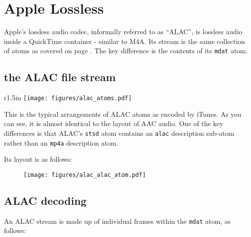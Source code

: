 
\chapter{Apple Lossless}

Apple's lossless audio codec, informally referred to as ``ALAC'',
is lossless audio inside a QuickTime container - similar to M4A.
Its stream is the same collection of atoms as covered on page
\pageref{m4a}.
The key difference is the contents of its \texttt{mdat} atom.

\section{the ALAC file stream}
\begin{wrapfigure}[6]{r}{1.5in}
\texttt{[image: figures/alac\_atoms.pdf]}
\end{wrapfigure}

This is the typical arrangements of ALAC atoms as encoded by iTunes.
As you can see, it is almost identical to the layout of AAC audio.
One of the key differences is that ALAC's \texttt{stsd} atom
contains an \texttt{alac} description sub-atom rather than an
\texttt{mp4a} description atom.

Its layout is as follows:

\begin{figure}[h]
\texttt{[image: figures/alac\_alac\_atom.pdf]}
\end{figure}

\pagebreak

\section{ALAC decoding}

An ALAC stream is made up of individual frames within the \texttt{mdat}
atom, as follows:

